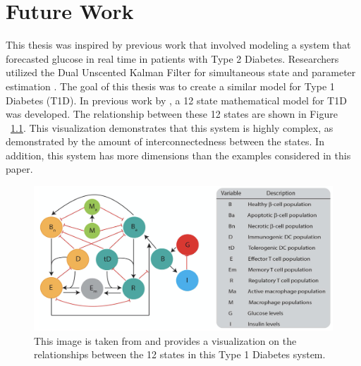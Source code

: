 \chapter{Future Work}
\label{Future Work}


This thesis was inspired by previous work that involved modeling a system that forecasted glucose in real time in patients with Type 2 Diabetes. Researchers utilized the Dual Unscented Kalman Filter for simultaneous state and parameter estimation \cite{article1}. The goal of this thesis was to create a similar model for Type 1 Diabetes (T1D). In previous work by \cite{Shtylla}, a 12 state mathematical model for T1D was developed. The relationship between these 12 states are shown in Figure ~\ref{fig:relations}. This visualization demonstrates that this system is highly complex, as demonstrated by the amount of interconnectedness between the states. In addition, this system has more dimensions than the examples considered in this paper.

\begin{figure}[h]
    \centering
    \includegraphics[scale = 0.4]{t1d_model.png}
    \caption{This image is taken from \cite{Shtylla} and provides a visualization on the relationships between the 12 states in this Type 1 Diabetes system.}
    \label{fig:relations}
\end{figure}

